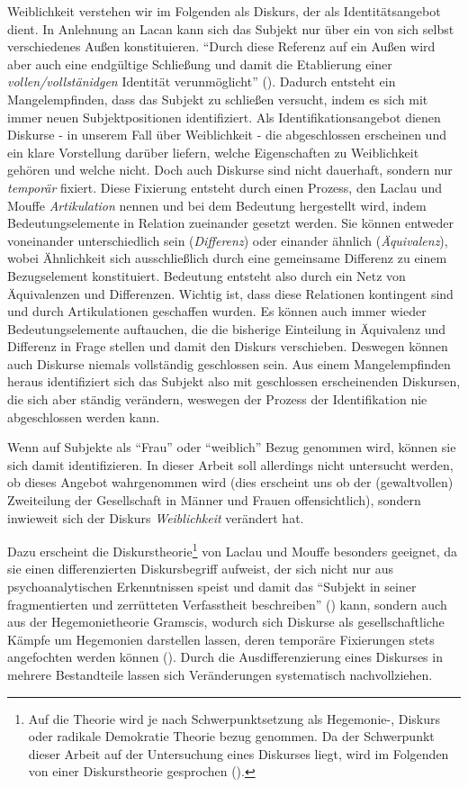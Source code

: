 \documentclass[12pt, titlepage=true, toc=bib]{scrartcl}
\begin{document}
Weiblichkeit verstehen wir im Folgenden als Diskurs, der als Identitätsangebot dient. In Anlehnung an Lacan kann sich das Subjekt nur über ein von sich selbst verschiedenes Außen konstituieren. "`Durch diese Referenz auf ein Außen wird aber auch eine endgültige Schließung und damit die Etablierung einer \textit{vollen/vollstänidgen} Identität verunmöglicht"' (\cite[199; Hervorh. im Orig.]{nonhoff_kollektive_2007}). Dadurch entsteht ein Mangelempfinden, dass das Subjekt zu schließen versucht, indem es sich mit immer neuen Subjektpositionen identifiziert. Als Identifikationsangebot dienen Diskurse - in unserem Fall über Weiblichkeit - die abgeschlossen erscheinen und ein klare Vorstellung darüber liefern, welche Eigenschaften zu Weiblichkeit gehören und welche nicht. Doch auch Diskurse sind nicht dauerhaft, sondern nur \textit{temporär} fixiert. Diese Fixierung entsteht durch einen Prozess, den Laclau und Mouffe \textit{Artikulation} nennen und bei dem Bedeutung hergestellt wird, indem Bedeutungselemente in Relation zueinander gesetzt werden. Sie können entweder voneinander unterschiedlich sein (\textit{Differenz}) oder einander ähnlich (\textit{Äquivalenz}), wobei Ähnlichkeit sich ausschließlich durch eine gemeinsame Differenz zu einem Bezugselement konstituiert. Bedeutung entsteht also durch ein Netz von Äquivalenzen und Differenzen. Wichtig ist, dass diese Relationen kontingent sind und durch Artikulationen geschaffen wurden. Es können auch immer wieder Bedeutungselemente auftauchen, die die bisherige Einteilung in Äquivalenz und Differenz in Frage stellen und damit den Diskurs verschieben. Deswegen können auch Diskurse niemals vollständig geschlossen sein. Aus einem Mangelempfinden heraus identifiziert sich das Subjekt also mit geschlossen erscheinenden Diskursen, die sich aber ständig verändern, weswegen der Prozess der Identifikation nie abgeschlossen werden kann.

Wenn auf Subjekte als "`Frau"' oder "`weiblich"' Bezug genommen wird, können sie sich damit identifizieren. In dieser Arbeit soll allerdings nicht untersucht werden, ob dieses Angebot wahrgenommen wird (dies erscheint uns ob der (gewaltvollen) Zweiteilung der Gesellschaft in Männer und Frauen offensichtlich), sondern inwieweit sich der Diskurs \textit{Weiblichkeit} verändert hat. 

Dazu erscheint die Diskurstheorie\footnote{Auf die Theorie wird je nach Schwerpunktsetzung als Hegemonie-, Diskurs oder radikale Demokratie Theorie bezug genommen. Da der Schwerpunkt dieser Arbeit auf der Untersuchung eines Diskurses liegt, wird im Folgenden von einer Diskurstheorie gesprochen (\cite[vgl.][]{nonhoff_diskurs_2007-1}).} von Laclau und Mouffe besonders geeignet, da sie einen differenzierten Diskursbegriff aufweist, der sich nicht nur aus psychoanalytischen Erkenntnissen speist und damit das "`Subjekt in seiner fragmentierten und zerrütteten Verfasstheit beschreiben"' (\cite[198]{nonhoff_kollektive_2007}) kann, sondern auch aus der Hegemonietheorie Gramscis, wodurch sich Diskurse als gesellschaftliche Kämpfe um Hegemonien darstellen lassen, deren temporäre Fixierungen stets angefochten werden können (\cite[vgl.][8-9]{nonhoff_diskurs_2007-1}). Durch die Ausdifferenzierung eines Diskurses in mehrere Bestandteile lassen sich Veränderungen systematisch nachvollziehen.
\end{document}
